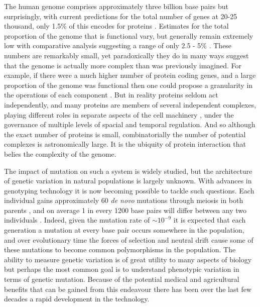 The human genome comprises approximately three billion base pairs but surprisingly, with current predictions for the total number of genes at 20-25 thousand, only 1.5\% of this encodes for proteins \citep{InternationalHumanGenomeSequencingConsortium2004}. Estimates for the total proportion of the genome that is functional vary, but generally remain extremely low with comparative analysis suggesting a range of only 2.5 - 5\% \citep{Waterston2002, Chiaromonte2003, Lunter2006}. These numbers are remarkably small, yet paradoxically they do in many ways suggest that the genome is actually more complex than was previously imagined. For example, if there were a much higher number of protein coding genes, and a large proportion of the genome was functional then one could propose a granularity in the operations of each component \citep{Piatigorsky1989}. But in reality proteins seldom act independently, and many proteins are members of several independent complexes, playing different roles in separate aspects of the cell machinery \citep{Jeffery2003}, under the governance of multiple levels of spacial and temporal regulation. And so although the exact number of proteins is small, combinatorially the number of potential complexes is astronomically large. It is the ubiquity of protein interaction that belies the complexity of the genome.

The impact of mutation on such a system is widely studied, but the architecture of genetic variation in natural populations is largely unknown. With advances in genotyping technology it is now becoming possible to tackle such questions. Each individual gains approximately 60 \emph{de novo} mutations through meiosis in both parents \citep{Conrad2011}, and on average 1 in every 1200 base pairs will differ between any two individuals \citep{Sachidanandam2001}. Indeed, given the mutation rate of $\sim 10^{-9}$ it is expected that each generation a mutation at every base pair occurs somewhere in the population, and over evolutionary time the forces of selection and neutral drift cause some of these mutations to become common polymorphisms in the population. The ability to measure genetic variation is of great utility to many aspects of biology but perhaps the most common goal is to understand phenotypic variation in terms of genetic mutation. Because of the potential medical and agricultural benefits that can be gained from this endeavour there has been over the last few decades a rapid development in the technology.

